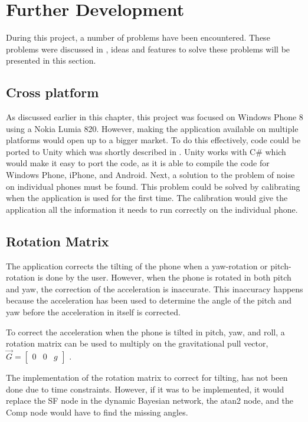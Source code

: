 \section{Further Development}\label{section:further-development}
During this project, a number of problems have been encountered. 
These problems were discussed in , ideas and features to solve these problems will be presented in this section.

\subsection{Cross platform}
As discussed earlier in this chapter, this project was focused on Windows Phone 8 using a Nokia Lumia 820. 
However, making the application available on multiple platforms would open up to a bigger market. 
To do this effectively, code could be ported to Unity which was shortly described in . 
Unity works with C\# which would make it easy to port the code, as it is able to compile the code for Windows Phone, iPhone, and Android.
Next, a solution to the problem of noise on individual phones must be found. 
This problem could be solved by calibrating when the application is used for the first time.
The calibration would give the application all the information it needs to run correctly on the individual phone. 

\subsection{Rotation Matrix}
The application corrects the tilting of the phone when a yaw-rotation or pitch-rotation is done by the user.
However, when the phone is rotated in both pitch and yaw, the correction of the acceleration is inaccurate.
This inaccuracy happens because the acceleration has been used to determine the angle of the pitch and yaw before the acceleration in itself is corrected.

To correct the acceleration when the phone is tilted in pitch, yaw, and roll, a rotation matrix can be used to multiply on the gravitational pull vector, $\vec{G} = \begin{bmatrix}
0 & 0 & g
\end{bmatrix}$ \cite{misc:rotation-matrix}.

The implementation of the rotation matrix to correct for tilting, has not been done due to time constraints.
However, if it was to be implemented, it would replace the SF node in the dynamic Bayesian network, the atan2 node, and the Comp node would have to find the missing angles. 

